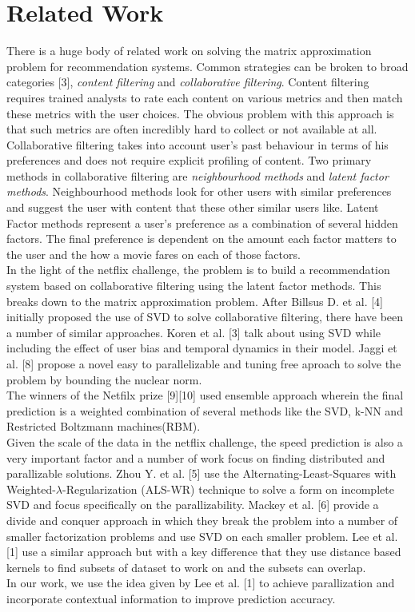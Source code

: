 \documentclass{article} %
\begin{document}
\section{Related Work}
There is a huge body of related work on solving the matrix approximation problem for recommendation systems. Common strategies can be broken to broad categories [3], {\it content filtering} and {\it collaborative filtering}. Content filtering requires trained analysts to rate each content on various metrics and then match these metrics with the user choices. The obvious problem with this approach is that such metrics are often incredibly hard to collect or not available at all.\\
Collaborative filtering takes into account user's past behaviour in terms of his preferences and does not require explicit profiling of content. Two primary methods in collaborative filtering are {\it neighbourhood methods} and {\it latent factor methods}. Neighbourhood methods look for other users with similar preferences and suggest the user with content that these other similar users like. Latent Factor methods represent a user's preference as a combination of several hidden factors. The final preference is dependent on the amount each factor matters to the user and the how a movie fares on each of those factors.\\
In the light of the netflix challenge, the problem is to build a recommendation system based on collaborative filtering using the latent factor methods. This breaks down to the matrix approximation problem. After Billsus D. et al. [4] initially proposed the use of SVD to solve collaborative filtering, there have been a number of similar approaches. Koren et al. [3] talk about using SVD while including the effect of user bias and temporal dynamics in their model. Jaggi et al. [8] propose a novel easy to parallelizable and tuning free aproach to solve the problem by bounding the nuclear norm.\\
The winners of the Netfilx prize [9][10] used ensemble approach wherein the final prediction is a weighted combination of several methods like the SVD, k-NN and Restricted Boltzmann machines(RBM).\\
Given the scale of the data in the netflix challenge, the speed prediction is also a very important factor and a number of work focus on finding distributed and parallizable solutions. Zhou Y. et al. [5] use the Alternating-Least-Squares with Weighted-${\lambda}$-Regularization (ALS-WR) technique to solve a form on incomplete SVD and focus specifically on the parallizability. Mackey et al. [6] provide a divide and conquer approach in which they break the problem into a number of smaller factorization problems and use SVD on each smaller problem. Lee et al. [1] use a similar approach but with a key difference that they use distance based kernels to find subsets of dataset to work on and the subsets can overlap.\\
In our work, we use the idea given by Lee et al. [1] to achieve parallization and incorporate contextual information to improve prediction accuracy.
\end{document}
